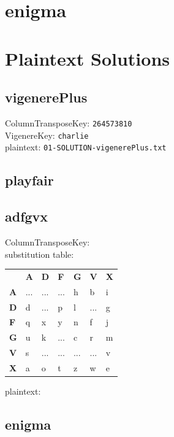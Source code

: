 \documentclass{article}
\begin{document}
\section{enigma}
\section{Plaintext Solutions}
\subsection{vigenerePlus}
ColumnTransposeKey: \texttt{264573810}\\
VigenereKey: \texttt{charlie}\\
plaintext: \texttt{01-SOLUTION-vigenerePlus.txt}
\subsection{playfair}
\subsection{adfgvx}
ColumnTransposeKey: \\
substitution table:
\\
\begin{table}[H]
\begin{tabular}{lllllll}
\textbf{} &
  \textbf{A} &
  \textbf{D} &
  \textbf{F} &
  \textbf{G} &
  \textbf{V} &
  \textbf{X} \\ \cline{2-7}
\multicolumn{1}{l|}{\textbf{A}} &
  \multicolumn{1}{l|}{...} &
  \multicolumn{1}{l|}{...} &
  \multicolumn{1}{l|}{...} &
  \multicolumn{1}{l|}{h} &
  \multicolumn{1}{l|}{b} &
  \multicolumn{1}{l|}{i} \\ \cline{2-7}
\multicolumn{1}{l|}{\textbf{D}} &
  \multicolumn{1}{l|}{d} &
  \multicolumn{1}{l|}{...} &
  \multicolumn{1}{l|}{p} &
  \multicolumn{1}{l|}{l} &
  \multicolumn{1}{l|}{...} &
  \multicolumn{1}{l|}{g} \\ \cline{2-7}
\multicolumn{1}{l|}{\textbf{F}} &
  \multicolumn{1}{l|}{q} &
  \multicolumn{1}{l|}{x} &
  \multicolumn{1}{l|}{y} &
  \multicolumn{1}{l|}{n} &
  \multicolumn{1}{l|}{f} &
  \multicolumn{1}{l|}{j} \\ \cline{2-7}
\multicolumn{1}{l|}{\textbf{G}} &
  \multicolumn{1}{l|}{u} &
  \multicolumn{1}{l|}{k} &
  \multicolumn{1}{l|}{...} &
  \multicolumn{1}{l|}{c} &
  \multicolumn{1}{l|}{r} &
  \multicolumn{1}{l|}{m} \\ \cline{2-7}
\multicolumn{1}{l|}{\textbf{V}} &
  \multicolumn{1}{l|}{s} &
  \multicolumn{1}{l|}{...} &
  \multicolumn{1}{l|}{...} &
  \multicolumn{1}{l|}{...} &
  \multicolumn{1}{l|}{...} &
  \multicolumn{1}{l|}{v} \\ \cline{2-7}
\multicolumn{1}{l|}{\textbf{X}} &
  \multicolumn{1}{l|}{a} &
  \multicolumn{1}{l|}{o} &
  \multicolumn{1}{l|}{t} &
  \multicolumn{1}{l|}{z} &
  \multicolumn{1}{l|}{w} &
  \multicolumn{1}{l|}{e} \\ \cline{2-7}
\end{tabular}
\end{table}
plaintext: 
\subsection{enigma}
\end{document}
